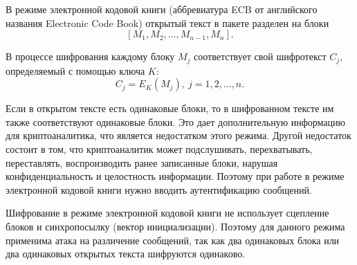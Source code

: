 В режиме электронной кодовой книги (аббревиатура ECB от английского названия Electronic Code Book) открытый текст в пакете разделен на блоки
    \[ \left[ M_1, M_2, \dots, M_{n-1}, M_n \right]. \]

В процессе шифрования каждому блоку $M_j$ соответствует свой шифротекст $C_j$, определяемый с помощью ключа $K$:
    \[ C_j = E_K(M_j), ~ j = 1, 2, \dots, n. \]

Если в открытом тексте есть одинаковые блоки, то в шифрованном тексте им также соответствуют одинаковые блоки. Это дает дополнительную информацию для криптоаналитика, что является недостатком этого режима. Другой недостаток состоит в том, что криптоаналитик может подслушивать, перехватывать, переставлять, воспроизводить ранее записанные блоки, нарушая конфиденциальность и целостность информации. Поэтому при работе в режиме электронной кодовой книги нужно вводить аутентификацию сообщений.

Шифрование в режиме электронной кодовой книги не использует сцепление блоков и синхропосылку (вектор инициализации). Поэтому для данного режима применима атака на различение сообщений, так как два одинаковых блока или два одинаковых открытых текста шифруются одинаково.


